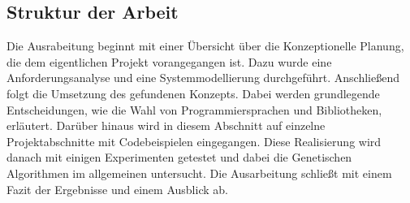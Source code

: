 \subsection{Struktur der Arbeit}
Die Ausrabeitung beginnt mit einer Übersicht über die Konzeptionelle Planung, die dem eigentlichen Projekt vorangegangen ist. Dazu wurde eine Anforderungsanalyse und eine Systemmodellierung durchgeführt. Anschließend folgt die Umsetzung des gefundenen Konzepts. Dabei werden grundlegende Entscheidungen, wie die Wahl von Programmiersprachen und Bibliotheken, erläutert. Darüber hinaus wird in diesem Abschnitt auf einzelne Projektabschnitte mit Codebeispielen eingegangen. Diese Realisierung wird danach mit einigen Experimenten getestet und dabei die Genetischen Algorithmen im allgemeinen untersucht. Die Ausarbeitung schließt mit einem Fazit der Ergebnisse und einem Ausblick ab.


